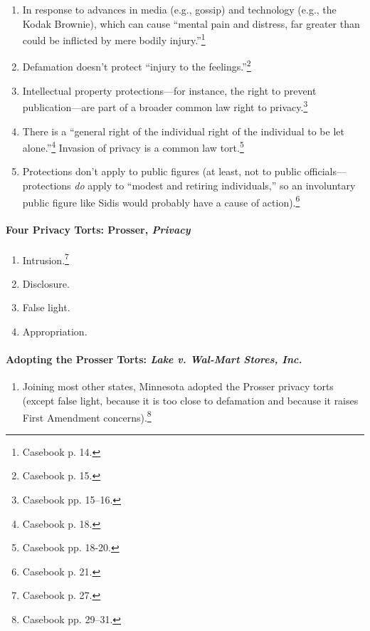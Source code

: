 \begin{enumerate}
    \item In response to advances in media (e.g., gossip) and technology 
    (e.g., the Kodak Brownie), which can cause ``mental pain and distress, far 
    greater than could be inflicted by mere bodily injury.''\footnote{Casebook 
    p. 14.}
    \item Defamation doesn't protect ``injury to the 
    feelings.''\footnote{Casebook p. 15.}
    \item Intellectual property protections---for instance, the right to 
    prevent publication---are part of a broader common law right to 
    privacy.\footnote{Casebook pp. 15--16.}
    \item There is a ``general right of the individual right of the individual 
    to be let alone.''\footnote{Casebook p. 18.} Invasion of privacy is a 
    common law tort.\footnote{Casebook pp. 18-20.}
    \item Protections don't apply to public figures (at least, not to public 
    officials---protections \emph{do} apply to ``modest and retiring 
    individuals,'' so an involuntary public figure like Sidis would probably 
    have a cause of action).\footnote{Casebook p. 21.}
\end{enumerate}

\paragraph{Four Privacy Torts: Prosser, \emph{Privacy}}

\begin{enumerate}
    \item Intrusion.\footnote{Casebook p. 27.}
    \item Disclosure.
    \item False light.
    \item Appropriation.
\end{enumerate}

\paragraph{Adopting the Prosser Torts: \emph{Lake v. Wal-Mart Stores, Inc.}}

\begin{enumerate}
    \item Joining most other states, Minnesota adopted the Prosser privacy 
    torts (except false light, because it is too close to defamation and 
    because it raises First Amendment concerns).\footnote{Casebook pp. 29--31.}
\end{enumerate}

